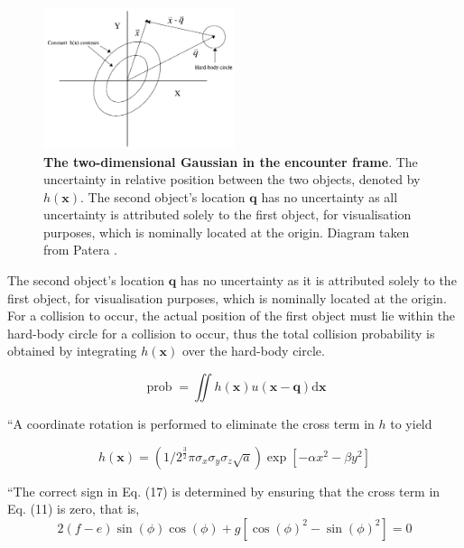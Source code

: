 \begin{figure}
    \centering
    \captionsetup{format=hang} %
    \includegraphics[width=0.5\textwidth]{graphics/encounter-frame.png}
    \caption{\textbf{The two-dimensional Gaussian in the encounter frame}. The uncertainty in relative position between the two objects, denoted by $h(\boldsymbol{x})$. The second object's location $\boldsymbol{q}$ has no uncertainty as all uncertainty is attributed solely to the first object, for visualisation purposes, which is nominally located at the origin. Diagram taken from Patera \cite{Patera2001}.}
    \label{fig:collision_2d_gaussian}
\end{figure}

The second object's location $\boldsymbol{q}$ has no uncertainty as it is attributed solely to the first object, for visualisation purposes, which is nominally located at the origin. For a collision to occur, the actual position of the first object must lie within the hard-body circle for a collision to occur, thus the total collision probability is obtained by integrating $h(\boldsymbol{x})$ over the hard-body circle. 

\begin{equation}
    \operatorname{prob}=\iint h(\boldsymbol{x}) u(\boldsymbol{x}-\boldsymbol{q}) \mathrm{d} \boldsymbol{x}
\end{equation}

``A coordinate rotation is performed to eliminate the cross term in $h$ to yield

\begin{equation}
    h(\boldsymbol{x})=\left(1 / 2^{\frac{3}{2}} \pi \sigma_{x} \sigma_{y} \sigma_{z} \sqrt{a}\right) \exp \left[-\alpha x^{2}-\beta y^{2}\right]
\end{equation}

``The correct sign in Eq. (17) is determined by ensuring that the cross term in Eq. (11) is zero, that is,
\begin{equation}
    2(f-e) \sin (\phi) \cos (\phi)+g\left[\cos (\phi)^{2}-\sin (\phi)^{2}\right]=0
\end{equation}

